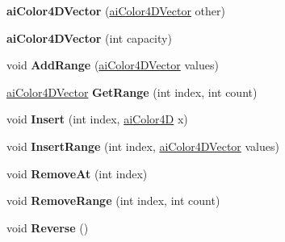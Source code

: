 \begin{DoxyCompactItemize}
\item 
\hypertarget{classai_color4_d_vector_ab7303a792b2b39b493e4abcce4aa86e0}{{\bfseries ai\+Color4\+D\+Vector} (\hyperlink{classai_color4_d_vector}{ai\+Color4\+D\+Vector} other)}\label{classai_color4_d_vector_ab7303a792b2b39b493e4abcce4aa86e0}

\item 
\hypertarget{classai_color4_d_vector_a312b63e90cc9c6f16e7d99bae6aab0ff}{{\bfseries ai\+Color4\+D\+Vector} (int capacity)}\label{classai_color4_d_vector_a312b63e90cc9c6f16e7d99bae6aab0ff}

\item 
\hypertarget{classai_color4_d_vector_a59d0dd154966a107032a5a735de924d8}{void {\bfseries Add\+Range} (\hyperlink{classai_color4_d_vector}{ai\+Color4\+D\+Vector} values)}\label{classai_color4_d_vector_a59d0dd154966a107032a5a735de924d8}

\item 
\hypertarget{classai_color4_d_vector_a0eb878b4af9889ac73438de385eed97c}{\hyperlink{classai_color4_d_vector}{ai\+Color4\+D\+Vector} {\bfseries Get\+Range} (int index, int count)}\label{classai_color4_d_vector_a0eb878b4af9889ac73438de385eed97c}

\item 
\hypertarget{classai_color4_d_vector_a3605e99c03629579cfc60e10a4ad680e}{void {\bfseries Insert} (int index, \hyperlink{structai_color4_d}{ai\+Color4\+D} x)}\label{classai_color4_d_vector_a3605e99c03629579cfc60e10a4ad680e}

\item 
\hypertarget{classai_color4_d_vector_a9bbfeb6cffeaf8eda77d241a61a7d70e}{void {\bfseries Insert\+Range} (int index, \hyperlink{classai_color4_d_vector}{ai\+Color4\+D\+Vector} values)}\label{classai_color4_d_vector_a9bbfeb6cffeaf8eda77d241a61a7d70e}

\item 
\hypertarget{classai_color4_d_vector_a8562ea67f634e4173c27e60152e596bf}{void {\bfseries Remove\+At} (int index)}\label{classai_color4_d_vector_a8562ea67f634e4173c27e60152e596bf}

\item 
\hypertarget{classai_color4_d_vector_a4687760b88c9962743606b881117e4e5}{void {\bfseries Remove\+Range} (int index, int count)}\label{classai_color4_d_vector_a4687760b88c9962743606b881117e4e5}

\item 
\hypertarget{classai_color4_d_vector_a8e087431fca0de39a2a7f8c0afa8b07d}{void {\bfseries Reverse} ()}\label{classai_color4_d_vector_a8e087431fca0de39a2a7f8c0afa8b07d}


\end{DoxyCompactItemize}

